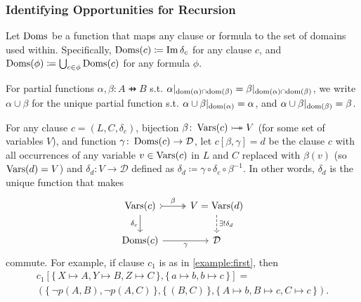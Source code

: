 \subsubsection{Identifying Opportunities for Recursion} \label{sec:ref}


Let $\operatorname{Doms}$ be a function that maps any clause or formula to the set of domains used within. Specifically, $\operatorname{Doms}(c) \coloneqq \operatorname{Im} \delta_c$ for any clause $c$, and $\operatorname{Doms}(\phi) \coloneqq \bigcup_{c \in \phi} \operatorname{Doms}(c)$ for any formula $\phi$.

For partial functions $\alpha, \beta\colon A \pfun B$ s.t. $\alpha|_{\operatorname{dom}(\alpha) \cap \operatorname{dom}(\beta)} = \beta|_{\operatorname{dom}(\alpha) \cap \operatorname{dom}(\beta)}$, we write $\alpha \cup \beta$ for the unique partial function s.t. $\alpha \cup \beta|_{\operatorname{dom}(\alpha)} = \alpha$, and $\alpha \cup \beta|_{\operatorname{dom}(\beta)} = \beta$.

For any clause $c = (L, C, \delta_c)$, bijection $\beta\colon \operatorname{Vars}(c) \mathrel{\rightarrowtail\kern-1.9ex\twoheadrightarrow} V$ (for some set of variables $V$), and function $\gamma\colon \operatorname{Doms}(c) \to \mathcal{D}$, let $c[\beta, \gamma] = d$ be the clause $c$ with all occurrences of any variable $v \in \operatorname{Vars}(c)$ in $L$ and $C$ replaced with $\beta(v)$ (so $\operatorname{Vars}(d) = V$) and $\delta_d\colon V \to \mathcal{D}$ defined as $\delta_d \coloneqq \gamma \circ \delta_c \circ \beta^{-1}$. In other words, $\delta_d$ is the unique function that makes
\[
\begin{tikzcd}
  \Vars(c) \ar[r, tail, two heads, "\beta"] \arrow[d, swap, "\delta_c"] & V = \Vars(d) \ar[d, dashed, "\exists!\delta_d"] \\
  \Doms(c) \ar[r, swap, "\gamma"] & \mathcal{D}
\end{tikzcd}
\]
commute. For example, if clause $c_1$ is as in \cref{example:first}, then
\begin{multline*}
  c_1[\{\, X \mapsto A, Y \mapsto B, Z \mapsto C \,\}, \{\, a \mapsto b, b \mapsto c \,\}] = \\
  (\{\, \neg p(A, B), \neg p(A, C) \,\}, \{\, (B, C) \,\}, \{\, A \mapsto b, B \mapsto c, C \mapsto c \,\}).
\end{multline*}


